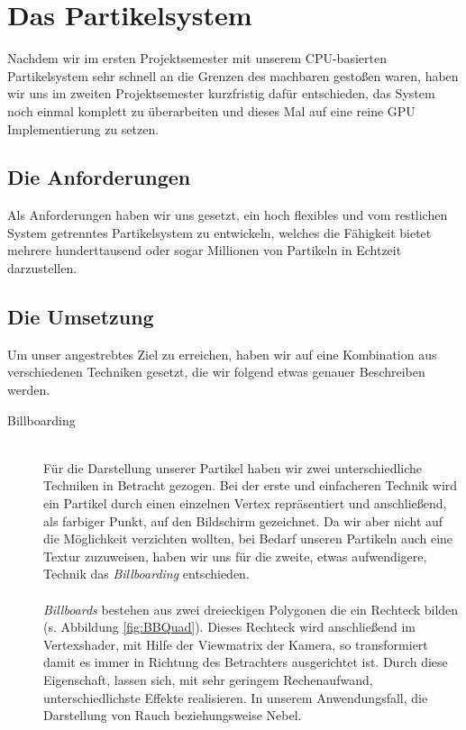 \section{Das Partikelsystem}
\begin{Spacing}{\mylinespace}

Nachdem wir im ersten Projektsemester mit unserem CPU-basierten Partikelsystem sehr schnell an die Grenzen des machbaren gestoßen waren, haben wir uns im zweiten Projektsemester kurzfristig dafür entschieden, das System noch einmal komplett zu überarbeiten und dieses Mal auf eine reine GPU Implementierung zu setzen.

\subsection{Die Anforderungen}

Als Anforderungen haben wir uns gesetzt, ein hoch flexibles und vom restlichen System getrenntes Partikelsystem zu entwickeln, welches die Fähigkeit bietet mehrere hunderttausend oder sogar Millionen von Partikeln in Echtzeit darzustellen.  

\subsection{Die Umsetzung}

Um unser angestrebtes Ziel zu erreichen, haben wir auf eine Kombination aus verschiedenen Techniken gesetzt, die wir folgend etwas genauer Beschreiben werden.
 
\begin{description}
	\item[Billboarding] \hfill \\
	Für die Darstellung unserer Partikel haben wir zwei unterschiedliche Techniken in Betracht gezogen. Bei der erste und einfacheren Technik wird ein Partikel durch einen einzelnen Vertex repräsentiert und anschließend, als farbiger Punkt, auf den Bildschirm gezeichnet. Da wir aber nicht auf die Möglichkeit verzichten wollten, bei Bedarf unseren Partikeln auch eine Textur zuzuweisen, haben wir uns für die zweite, etwas aufwendigere, Technik das \textit{Billboarding} entschieden.
\\\\
\textit{Billboards} bestehen aus zwei dreieckigen Polygonen die ein Rechteck bilden (s. Abbildung \ref{fig:BBQuad}).	Dieses Rechteck wird anschließend im Vertexshader, mit Hilfe der Viewmatrix der Kamera, so transformiert damit es immer in Richtung des Betrachters ausgerichtet ist. Durch diese Eigenschaft, lassen sich, mit sehr geringem Rechenaufwand, unterschiedlichste Effekte realisieren. In unserem Anwendungsfall, die Darstellung von Rauch beziehungsweise Nebel. 


\end{description}
\end{Spacing}
